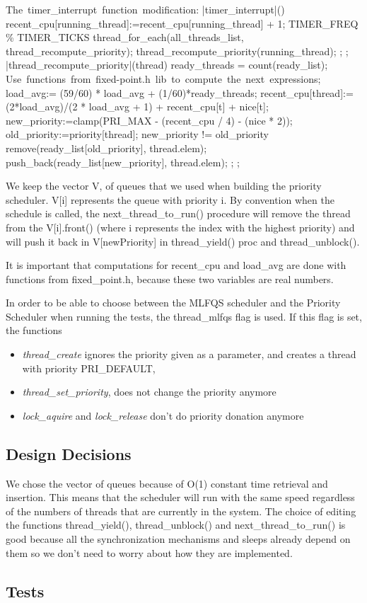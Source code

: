 	\begin{program}
	\mbox{The timer\_interrupt function modification:}     
	\PROC |timer\_interrupt|() \BODY
		recent\_cpu[running\_thread]:=recent\_cpu[running\_thread] + 1;
		\IF TIMER\_FREQ \% TIMER\_TICKS  
		      \THEN thread\_for\_each(all\_threads\_list, thread\_recompute\_priority); 
		      \ELSE thread\_recompute\_priority(running\_thread);
		\FI;
	\END;
	\PROC |thread\_recompute\_priority|(thread) \BODY
		ready\_threads = count(ready\_list);
		\mbox{Use functions from fixed-point.h lib to compute the next expressions};
		load\_avg:= (59/60) * load\_avg + (1/60)*ready_threads; 
		recent\_cpu[thread]:= (2*load\_avg)/(2 * load\_avg + 1) + recent\_cpu[t] + nice[t];
		new\_priority:=clamp(PRI\_MAX - (recent\_cpu / 4) - (nice * 2));
		old\_priority:=priority[thread];
		\IF new\_priority != old\_priority
		      \THEN remove(ready\_list[old\_priority], thread.elem);
			    push\_back(ready\_list[new\_priority], thread.elem);
		\FI;
	\END;
	\end{program}
	We keep the vector V, of queues that we used when building the priority scheduler. V[i] represents the queue with priority i. By convention when the schedule is called, the next\_thread\_to\_run() procedure will remove the thread from the V[i].front() (where i represents the index with the highest priority) and will push it back in V[newPriority] in thread\_yield() proc and thread\_unblock().


	It is important that computations for recent\_cpu and load\_avg are done with functions from fixed\_point.h, because these two variables are real numbers.

	In order to be able to choose between the MLFQS scheduler and the Priority Scheduler when running the tests, the thread\_mlfqs flag is used. If this flag is set, the functions 
	\begin{itemize}
	  \item \textit{thread\_create} ignores the priority given as a parameter, and creates a thread with priority PRI\_DEFAULT,
	  \item \textit{thread\_set\_priority}, does not change the priority anymore
	  \item \textit{lock\_aquire} and \textit{lock\_release} don't do priority donation anymore
	\end{itemize}

    \subsection{Design Decisions}
We chose the vector of queues because of O(1) constant time retrieval and insertion. This means that the scheduler will run with the same speed regardless of the numbers of threads that are currently in the system. The choice of editing the functions thread\_yield(), thread\_unblock() and next\_thread\_to\_run() is good because all the synchronization mechanisms and sleeps already depend on them so we don't need to worry about how they are implemented.



    \subsection{Tests}

